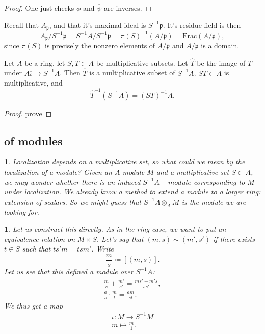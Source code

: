 \documentclass[12pt]{article}
\newtheorem{para}[theorem]{}
\begin{document}
\begin{proof}
	One just checks $\phi$ and $\overline{\psi}$ are inverses.
\end{proof}

\begin{example}
	Recall that $A_\mathfrak{p}$, and that it's maximal ideal is $S^{-1}\mathfrak{p}$. It's residue field is then 
	\begin{equation*}
		A_\mathfrak{p}/S^{-1}\mathfrak{p} = S^{-1}A/S^{-1}\mathfrak{p} = \pi(S)^{-1}(A/\mathfrak{p}) = \text{Frac}(A/\mathfrak{p}),
	\end{equation*}
	since $\pi(S)$ is precisely the nonzero elements of $A/\mathfrak{p}$ and $A/\mathfrak{p}$ is a domain.
\end{example}

\begin{proposition}
	Let $A$ be a ring, let $S,T\subset A$ be multiplicative subsets. Let $\hat{T}$ be the image of $T$ under $A\overline{\iota}{\to}S^{-1}A$. Then $\hat{T}$ is a multiplicative subset of $S^{-1}A$, $ST\subset A$ is multiplicative, and 
	\begin{equation*}
		\hat{T}^{-1}(S^{-1}A)=(ST)^{-1}A.
	\end{equation*}
\end{proposition}
\begin{proof}
	prove 
\end{proof}


\subsection{of modules} %

\begin{para}
	Localization depends on a multiplicative set, so what could we mean by the localization of a module? Given an $A$-module $M$ and a multiplicative set $S\subset A$, we may wonder whether there is an induced $S^{-1}A-module$ corresponding to $M$ under localization. We already know a method to extend a module to a larger ring: extension of scalars. So we might guess that $S^{-1}A\otimes_A M$ is the module we are looking for.
\end{para}

\begin{para}
	Let us construct this directly. As in the ring case, we want to put an equivalence relation on $M\times S$. Let's say that $(m,s)\sim(m',s')$ if there exists $t\in S$ such that $ts'm=tsm'$. Write 
	\begin{equation*}
		\frac{m}{s} \coloneqq [(m,s)].
	\end{equation*}
	Let us see that this defined a module over $S^{-1}A$:
	\begin{gather*}
		\frac{m}{s} + \frac{m'}{s'} = \frac{ms'+m's}{ss'}, \\
		\frac{a}{s}\cdot \frac{m}{t} = \frac{am}{st}.
	\end{gather*}
	We thus get a map 
	\begin{gather*}
		\iota: M\to S^{-1}M \\
		m \mapsto \frac{m}{1}.
	\end{gather*}
\end{para}
\end{document}
